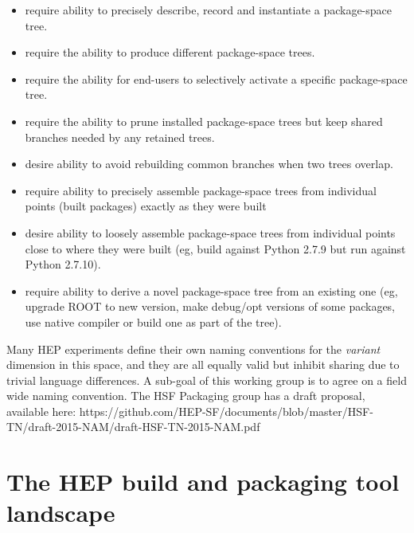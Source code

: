 \documentclass[12pt,a4paper]{article}
\begin{document}
\begin{itemize}

\item require ability to precisely describe, record and instantiate a
package-space tree.

\item require the ability to produce different package-space trees.

\item require the ability for end-users to selectively activate a
specific package-space tree.

\item require the ability to prune installed package-space trees but
keep shared branches needed by any retained trees.

\item desire ability to avoid rebuilding common branches when two trees
overlap.

\item require ability to precisely assemble package-space trees from
individual points (built packages) exactly as they were built

\item desire ability to loosely assemble package-space trees from
individual points close to where they were built (eg, build against
Python 2.7.9 but run against Python 2.7.10).

\item require ability to derive a novel package-space tree from an
existing one (eg, upgrade ROOT to new version, make debug/opt versions
of some packages, use native compiler or build one as part of the tree).

\end{itemize}
Many HEP experiments define their own naming conventions for the \textit{variant} dimension in this space, and they are all equally valid but inhibit sharing due to trivial language differences.  A sub-goal of this working group is to agree on a field wide naming convention. The HSF Packaging group has a draft proposal, available here: https://github.com/HEP-SF/documents/blob/master/HSF-TN/draft-2015-NAM/draft-HSF-TN-2015-NAM.pdf

\section{The HEP build and packaging tool landscape}
\end{document}
